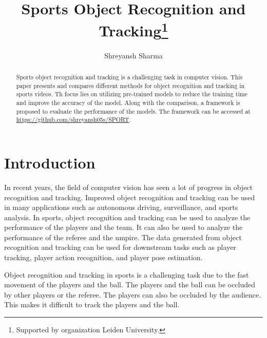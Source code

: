 \documentclass[runningheads]{llncs}
\begin{document}
%
\title{Sports Object Recognition and Tracking\thanks{Supported by organization Leiden University.}}
%
%
\author{Shreyansh Sharma }
%
%
%
\maketitle              %
%
\begin{abstract}
% 
Sports object recognition and tracking is a challenging task in computer vision. 
This paper presents and compares different methods for object recognition and tracking in sports videos.
Th focus lies on utilizing pre-trained models to reduce the training time and improve the accuracy of the model.
Along with the comparison, a framework is proposed to evaluate the performance of the models.
The framework can be accessed at \url{https://github.com/shreyansh05s/SPORT}.
\end{abstract}
%
%
%
\section{Introduction}
In recent years, the field of computer vision has seen a lot of progress in object recognition and tracking.
Improved object recognition and tracking can be used in many applications such as autonomous driving, surveillance, and sports analysis.
In sports, object recognition and tracking can be used to analyze the performance of the players and the team.
It can also be used to analyze the performance of the referee and the umpire.
The data generated from object recognition and tracking can be used for downstream tasks such as player tracking, player action recognition, and player pose estimation.

Object recognition and tracking in sports is a challenging task due to the fast movement of the players and the ball.
The players and the ball can be occluded by other players or the referee.
The players can also be occluded by the audience.
This makes it difficult to track the players and the ball.
\end{document}
